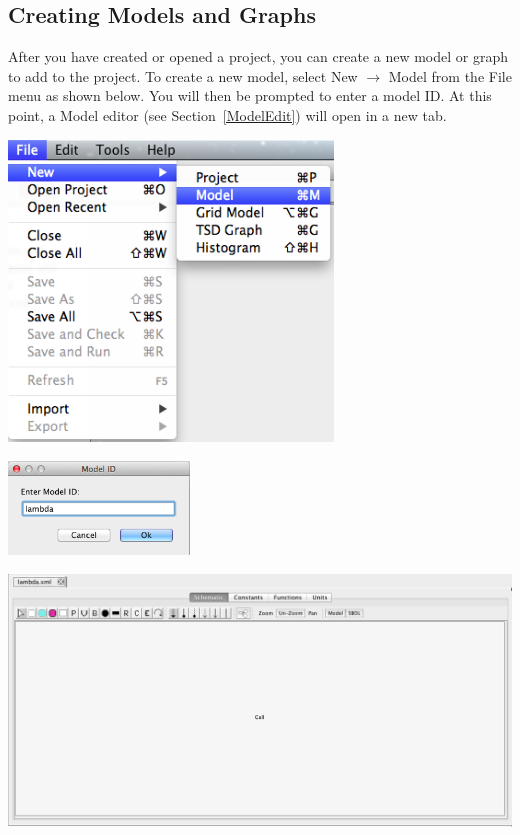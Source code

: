 \documentclass[titlepage,11pt]{article}
\begin{document}
\clearpage

\subsection{Creating Models and Graphs}

\noindent
After you have created or opened a project, you can create a new model or graph to add to the project.  To create a new model, select New $\rightarrow$ Model from the File menu as shown below. You will then be prompted to enter a model ID.  At this point, a Model editor (see Section~\ref{ModelEdit}) will open in a new tab.  

\begin{center}
\includegraphics[height=80mm]{screenshots/newModel}
\end{center}

\begin{center}
\includegraphics[height=25mm]{screenshots/ModelId}
\end{center}

\begin{center}
\includegraphics[width=160mm]{screenshots/ModelEditor}
\end{center}
\end{document}
